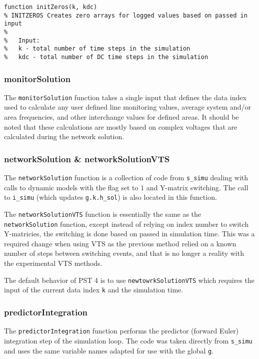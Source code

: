 \begin{verbatim}
function initZeros(k, kdc)
% INITZEROS Creates zero arrays for logged values based on passed in input
%
%   Input:
%   k - total number of time steps in the simulation
%   kdc - total number of DC time steps in the simulation
\end{verbatim}


\subsubsection{monitorSolution}  
The \verb|monitorSolution| function takes a single input that defines the data index used to calculate any user defined line monitoring values, average system and/or area frequencies, and other interchange values for defined areas.
It should be noted that these calculations are mostly based on complex voltages that are calculated during the network solution.


\subsubsection{networkSolution \& networkSolutionVTS}  
The \verb|networkSolution| function is a collection of code from \verb|s_simu| dealing with calls to dynamic models with the flag set to $1$ and Y-matrix switching.
The call to \verb|i_simu| (which updates \verb|g.k.h_sol|) is also located in this function.

The \verb|networkSolutionVTS| function is essentially the same as the \verb|networkSolution| function, except instead of relying on index number to switch Y-matricies, the switching is done based on passed in simulation time.
This was a required change when using VTS as the previous method relied on a known number of steps between switching events, and that is no longer a reality with the experimental VTS methods.

The default behavior of PST 4 is to use \verb|newtowrkSolutionVTS| which requires the input of the current data index \verb|k| and the simulation time.

\subsubsection{predictorIntegration}  
The \verb|predictorIntegration| function performs the predictor (forward Euler) integration step of the simulation loop.
The code was taken directly from \verb|s_simu| and uses the same variable names adapted for use with the global \verb|g|.

